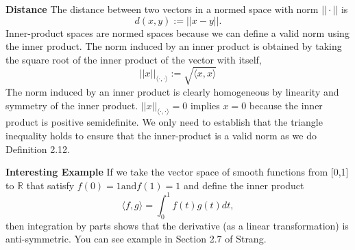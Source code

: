 \documentclass[12pt]{article}
\newenvironment{corollary}[2][Corollary]{\begin{trivlist}
\item[\hskip \labelsep {\bfseries #1}\hskip \labelsep {\bfseries #2}]}{\end{trivlist}}
\begin{document}

\begin{corollary}{2.11.2} \textbf{Distance} The distance between two vectors in a normed space with norm \(||\cdot||\) is
\[d(x,y) := ||x-y||.\]
\noindent
Inner-product spaces are normed spaces because we can define a valid norm using the inner product. The norm induced by an inner product is obtained by taking the square root of the inner product of the vector with itself,
\[||x||_{\langle \cdot, \cdot \rangle} := \sqrt{\langle x,x \rangle}\]
\noindent
The norm induced by an inner product is clearly homogeneous by linearity and symmetry of the inner product. \(||x||_{\langle \cdot, \cdot \rangle} = 0 \) implies \(x = 0\) because the inner product is positive semidefinite. We only need to establish that the triangle inequality holds to ensure that the inner-product is a valid norm as we do Definition 2.12.
\end{corollary}


\begin{corollary}{2.11.3} \textbf{Interesting Example} If we take the vector space of smooth functions from [0,1] to \(\mathbb{R}\) that satisfy \(f(0) = 1 \textrm{and} f(1) = 1\) and define the inner product
\[\langle f, g \rangle = \int_0^1 f(t)g(t)dt,\]
\noindent
then integration by parts shows that the derivative (as a linear transformation) is anti-symmetric. You can see example in Section 2.7 of Strang.
\end{corollary}

\end{document}
